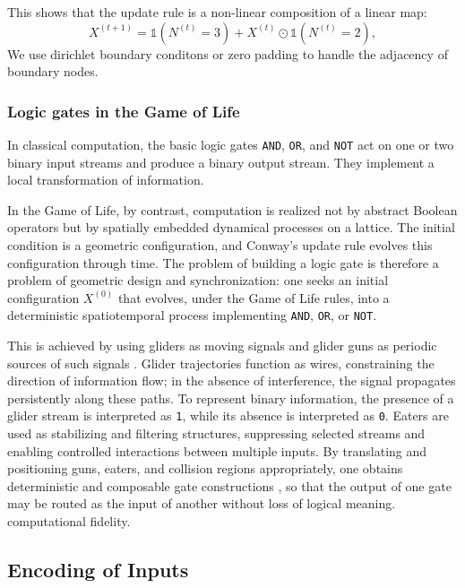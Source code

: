This shows that the update rule is a non-linear composition of a linear map:
\begin{equation}
X^{(t+1)} = \mathbb{1}\!\left(N^{(t)} = 3\right)
+ X^{(t)} \odot \mathbb{1}\!\left(N^{(t)} = 2\right),
\end{equation}
We use dirichlet boundary conditons or zero padding to handle the adjacency of boundary nodes.

\subsubsection*{Logic gates in the Game of Life}
In classical computation, the basic logic gates \texttt{AND}, \texttt{OR}, and \texttt{NOT} act on one or two binary input streams and produce a binary output stream. They implement a local transformation of information.

In the Game of Life, by contrast, computation is realized not by abstract Boolean operators but by spatially embedded dynamical processes on a lattice. The initial condition is a geometric configuration, and Conway's update rule evolves this configuration through time. The problem of building a logic gate is therefore a problem of geometric design and synchronization: one seeks an initial configuration $X^{(0)}$ that evolves, under the Game of Life rules, into a deterministic spatiotemporal process implementing \texttt{AND}, \texttt{OR}, or \texttt{NOT}.

This is achieved by using gliders as moving signals and glider guns as periodic sources of such signals \cite{gliderwiki,glidergunwiki}. Glider trajectories function as wires, constraining the direction of information flow; in the absence of interference, the signal propagates persistently along these paths. To represent binary information, the presence of a glider stream is interpreted as \texttt{1}, while its absence is interpreted as \texttt{0}. Eaters are used as stabilizing and filtering structures, suppressing selected streams and enabling controlled interactions between multiple inputs. By translating and positioning guns, eaters, and collision regions appropriately, one obtains deterministic and composable gate constructions \cite{golgatevideo}, so that the output of one gate may be routed as the input of another without loss of logical meaning.
computational fidelity.

\subsection{Encoding of Inputs}

